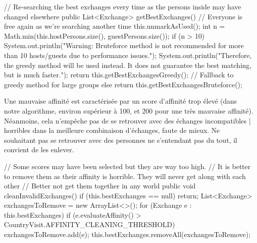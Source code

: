 \documentclass{mytex}
\begin{document}
\begin{codebox}
// Re-searching the best exchanges every time as the persons inside may have changed elsewhere
public List<Exchange> getBestExchanges() {
	// Everyone is free again as we're searching another time
	this.unmarkAsUsed();
	int n = Math.min(this.hostPersons.size(), guestPersons.size());
	if (n > 10) {
		System.out.println("Warning: Bruteforce method is not recommended for more than 10 hosts/guests due to performance issues.");
		System.out.println("Therefore, the greedy method will be used instead. It does not guarantee the best matching, but is much faster.");
		return this.getBestExchangesGreedy(); // Fallback to greedy method for large groups
	} else {
		return this.getBestExchangesBruteforce();
	}
}
\end{codebox}




Une mauvaise affinité est caractérisée par un score d'affinité trop élevé (dans notre algorithme, environ supérieur à 100, et 200 pour une très mauvaise affinité). Néanmoins, cela n'empêche pas de se retrouver avec des échanges incompatibles | horribles dans la meilleure combinaison d'échanges, faute de mieux. Ne souhaitant pas se retrouver avec des personnes ne s'entendant pas du tout, il convient de les enlever.

\begin{codebox}
// Some scores may have been selected but they are way too high.
// It is better to remove them as their affinity is horrible. They will never get along with each other
// Better not get them together in any world
public void cleanInvalidExchanges() {
	if (this.bestExchanges == null) return;
	List<Exchange> exchangesToRemove = new ArrayList<>();
	for (Exchange e : this.bestExchanges) {
		if (e.evaluateAffinity() > CountryVisit.AFFINITY_CLEANING_THRESHOLD) {
			exchangesToRemove.add(e);
		}
	}
	this.bestExchanges.removeAll(exchangesToRemove);
}
\end{codebox}



\end{document}
